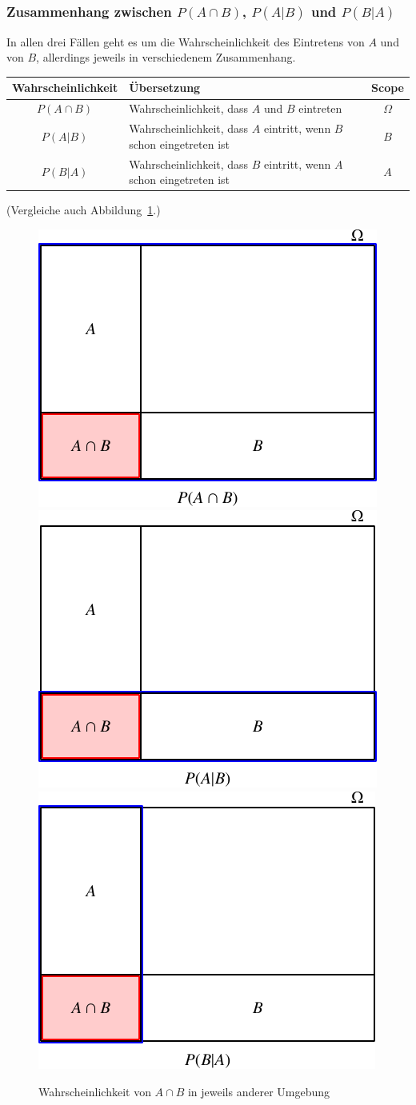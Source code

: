 \subsubsection{Zusammenhang zwischen \texorpdfstring{$P(A\cap B)$}{P(A geschnitten B)}, \texorpdfstring{$P(A|B)$}{P(A bedingt B)} und \texorpdfstring{$P(B|A)$}{P(B bedingt A)}}
In allen drei Fällen geht es um die Wahrscheinlichkeit des Eintretens
von $A$ und von $B$, allerdings jeweils in verschiedenem
Zusammenhang.
\begin{center}
\begin{tabular}{|c|l|c|}
\hline
Wahrscheinlichkeit&Übersetzung&Scope\\
\hline
$P(A\cap B)$&\strut Wahrscheinlichkeit, dass $A$ und $B$ eintreten\strut &$\Omega$\\
$P(A|B)$&\begin{minipage}[t]{3.0in}\strut Wahrscheinlichkeit, dass $A$ eintritt, wenn $B$ schon eingetreten ist\strut \end{minipage}&$B$\\
$P(B|A)$&\begin{minipage}[t]{3.0in}\strut Wahrscheinlichkeit, dass $B$ eintritt, wenn $A$ schon eingetreten ist\strut \end{minipage}&$A$\\
\hline
\end{tabular}
\end{center}
(Vergleiche auch Abbildung~\ref{condprob}.)
\begin{figure}
\begin{center}
\includegraphics[width=0.3\hsize]{images/abhaengigkeit-3}\quad
\includegraphics[width=0.3\hsize]{images/abhaengigkeit-5}\quad
\includegraphics[width=0.3\hsize]{images/abhaengigkeit-4}
\end{center}
\caption{Wahrscheinlichkeit von $A\cap B$ in jeweils anderer Umgebung
\label{condprob}}
\end{figure}

